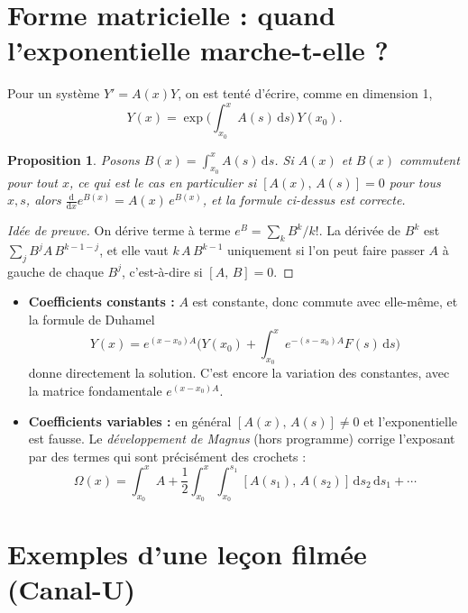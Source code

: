 \documentclass[11pt,a4paper]{article}
\theoremstyle{plain}
\newtheorem{proposition}[theoreme]{Proposition}
\theoremstyle{definition}
\theoremstyle{remark}
\newcommand{\cro}[2]{\left[#1,\,#2\right]}
\newcommand{\dd}{\mathrm{d}}
\begin{document}
\section{Forme matricielle : quand l'exponentielle marche-t-elle ?}

Pour un système $Y' = A(x)Y$, on est tenté d'écrire, comme en dimension 1,
\[
  Y(x) = \exp\!\Big(\int_{x_0}^{x} A(s)\,\dd s\Big)\, Y(x_0).
\]

\begin{proposition}\label{prop:expo}
Posons $B(x) = \int_{x_0}^x A(s)\,\dd s$. Si $A(x)$ et $B(x)$ commutent pour tout $x$, ce qui est le cas en particulier si $\cro{A(x)}{A(s)} = 0$ pour tous $x, s$, alors $\frac{\dd}{\dd x} e^{B(x)} = A(x)\, e^{B(x)}$, et la formule ci-dessus est correcte.
\end{proposition}

\begin{proof}[Idée de preuve]
On dérive terme à terme $e^{B} = \sum_k B^k/k!$. La dérivée de $B^k$ est $\sum_{j} B^{j} A\, B^{k-1-j}$, et elle vaut $k\,A\,B^{k-1}$ uniquement si l'on peut faire passer $A$ à gauche de chaque $B^j$, c'est-à-dire si $\cro{A}{B}=0$.
\end{proof}

\begin{itemize}
\item \textbf{Coefficients constants :} $A$ est constante, donc commute avec elle-même, et la formule de Duhamel
\[
  Y(x) = e^{(x-x_0)A}\Big(Y(x_0) + \int_{x_0}^x e^{-(s-x_0)A} F(s)\,\dd s\Big)
\]
donne directement la solution. C'est encore la variation des constantes, avec la matrice fondamentale $e^{(x-x_0)A}$.
\item \textbf{Coefficients variables :} en général $\cro{A(x)}{A(s)} \neq 0$ et l'exponentielle est fausse. Le \emph{développement de Magnus} (hors programme) corrige l'exposant par des termes qui sont précisément des crochets :
\[
  \Omega(x) = \int_{x_0}^x A + \frac12 \int_{x_0}^{x}\!\!\int_{x_0}^{s_1} \cro{A(s_1)}{A(s_2)}\,\dd s_2\,\dd s_1 + \cdots
\]
\end{itemize}

\section{Exemples d'une leçon filmée (Canal-U)}\label{sec:video}
\end{document}
